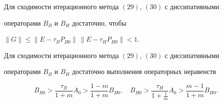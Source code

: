 \begin{thm} 


Для сходимости итерационного метода $(29)$, $(30)$ с диссипативными 


операторами $B_B$ и $B_H$ достаточно, чтобы 


$\|G\|\le\|E-\tau_B P_{B0}\|\,\|E-\tau_H P_{H0}\|<1$. 


\end{thm} 


 


\begin{thm} 


Для сходимости итерационного метода $(29)$, $(30)$ с диссипативными 


операторами $B_B$ и $B_H$ достаточно выполнения операторных неравенств 


\begin{equation} 


B_{B0}>\frac{\tau_B}{1+m}A_0>\frac{1-m}{1+m}B_{B0},\quad 


B_{H0}>\frac{\tau_H}{1+\frac{1}{m}}A_0> 


\frac{m-1}{1+m}B_{H0}. 


\end{equation} 


\end{thm} 


 


